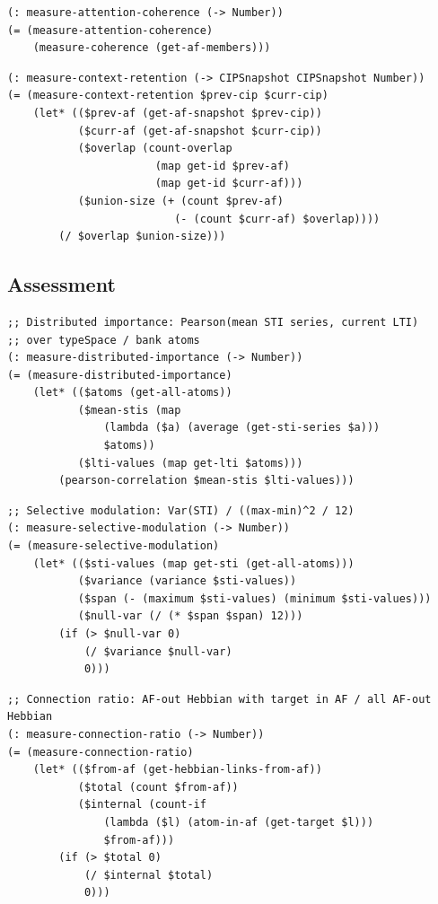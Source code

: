 \documentclass[11pt]{article}
\theoremstyle{definition}
\begin{document}
\begin{lstlisting}[style=metta, caption=Coherence]
(: measure-attention-coherence (-> Number))
(= (measure-attention-coherence)
    (measure-coherence (get-af-members)))
\end{lstlisting}

\begin{lstlisting}[style=metta, caption=Retention]
(: measure-context-retention (-> CIPSnapshot CIPSnapshot Number))
(= (measure-context-retention $prev-cip $curr-cip)
    (let* (($prev-af (get-af-snapshot $prev-cip))
           ($curr-af (get-af-snapshot $curr-cip))
           ($overlap (count-overlap
                       (map get-id $prev-af)
                       (map get-id $curr-af)))
           ($union-size (+ (count $prev-af)
                          (- (count $curr-af) $overlap))))
        (/ $overlap $union-size)))
\end{lstlisting}

\subsection{Assessment}

\begin{lstlisting}[style=metta, caption=Assessment]
;; Distributed importance: Pearson(mean STI series, current LTI)
;; over typeSpace / bank atoms
(: measure-distributed-importance (-> Number))
(= (measure-distributed-importance)
    (let* (($atoms (get-all-atoms))
           ($mean-stis (map
               (lambda ($a) (average (get-sti-series $a)))
               $atoms))
           ($lti-values (map get-lti $atoms)))
        (pearson-correlation $mean-stis $lti-values)))
\end{lstlisting}

\begin{lstlisting}[style=metta, caption=Assessment]
;; Selective modulation: Var(STI) / ((max-min)^2 / 12)
(: measure-selective-modulation (-> Number))
(= (measure-selective-modulation)
    (let* (($sti-values (map get-sti (get-all-atoms)))
           ($variance (variance $sti-values))
           ($span (- (maximum $sti-values) (minimum $sti-values)))
           ($null-var (/ (* $span $span) 12)))
        (if (> $null-var 0)
            (/ $variance $null-var)
            0)))
\end{lstlisting}

\begin{lstlisting}[style=metta, caption=Assessment]
;; Connection ratio: AF-out Hebbian with target in AF / all AF-out Hebbian
(: measure-connection-ratio (-> Number))
(= (measure-connection-ratio)
    (let* (($from-af (get-hebbian-links-from-af))
           ($total (count $from-af))
           ($internal (count-if
               (lambda ($l) (atom-in-af (get-target $l)))
               $from-af)))
        (if (> $total 0)
            (/ $internal $total)
            0)))
\end{lstlisting}
\end{document}
